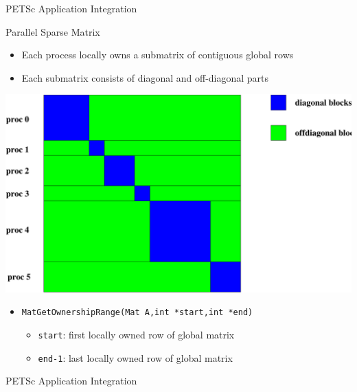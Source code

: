 \begin{frame}[fragile]{PETSc Application Integration}

\begin{block}{Parallel Sparse Matrix}
\begin{itemize}
  \item Each process locally owns a submatrix of contiguous global rows
  \item Each submatrix consists of diagonal and off-diagonal parts
\end{itemize}

\begin{center}
\includegraphics[width=3.in]{figures/parallelSparseMatrix}
\end{center}

\begin{itemize}
  \item \lstinline|MatGetOwnershipRange(Mat A,int *start,int *end)|
  \begin{itemize}
    \item \lstinline|start|: first locally owned row of global matrix
    \item \lstinline|end-1|: last locally owned row of global matrix
  \end{itemize}
\end{itemize}
\end{block}
\end{frame}

\begin{frame}[fragile]{PETSc Application Integration}

\end{frame}


